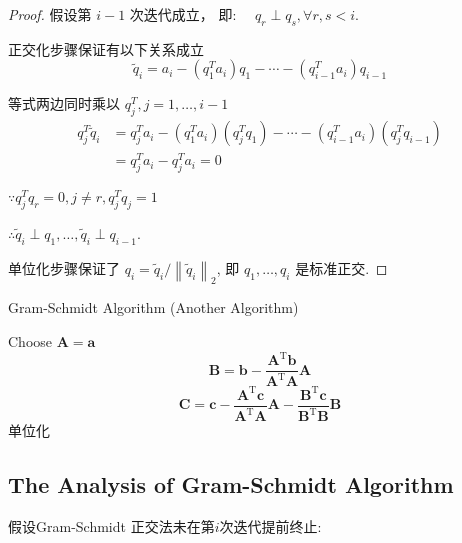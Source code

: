 \begin{proof}
    假设第 $ i-1 $ 次迭代成立， 即: $ \quad q_{r} \perp q_{s}, \forall r, s<i $.

    正交化步骤保证有以下关系成立
    $$ \widetilde{q}_{i}=a_{i}-\left(q_{1}^{T} a_{i}\right) q_{1}-\cdots-\left(q_{i-1}^{T} a_{i}\right) q_{i-1} $$

    等式两边同时乘以 $ q_{j}^{T}, j=1, \ldots, i-1 $
    $$ \begin{aligned} q_{j}^{T} \tilde{q}_{i} &=q_{j}^{T} a_{i}-\left(q_{1}^{T} a_{i}\right)\left(q_{j}^{T} q_{1}\right)-\cdots-\left(q_{i-1}^{T} a_{i}\right)\left(q_{j}^{T} q_{i-1}\right) \\ &=q_{j}^{T} a_{i}-q_{j}^{T} a_{i}=0  \end{aligned} $$

    $ \because q_{j}^{T} q_{r}=0, j \neq r, q_{j}^{T} q_{j}=1 $

     $\therefore \widetilde{q}_{i} \perp q_{1}, \ldots, \widetilde{q}_{i} \perp q_{i-1} $.

    单位化步骤保证了 $ q_{i}=\widetilde{q}_{i} /\left\|\widetilde{q}_{i}\right\|_{2} $, 即 $ q_{1}, \ldots, q_{i} $ 是标准正交. 
\end{proof}

\begin{algorithm}
    \caption{Gram-Schmidt Algorithm (Another Algorithm)}
    Choose $ \boldsymbol{A}=\boldsymbol{a} $\;
    $$ \boldsymbol{B}=\boldsymbol{b}-\frac{\boldsymbol{A}^{\mathrm{T}} \boldsymbol{b}}{\boldsymbol{A}^{\mathrm{T}} \boldsymbol{A}} \boldsymbol{A} $$\;
    $$ \boldsymbol{C}=\boldsymbol{c}-\frac{\boldsymbol{A}^{\mathrm{T}} \boldsymbol{c}}{\boldsymbol{A}^{\mathrm{T}} \boldsymbol{A}} \boldsymbol{A}-\frac{\boldsymbol{B}^{\mathrm{T}} \boldsymbol{c}}{\boldsymbol{B}^{\mathrm{T}} \boldsymbol{B}} \boldsymbol{B}   $$\;
    单位化\;
\end{algorithm}

\subsection{The Analysis of Gram-Schmidt Algorithm}

假设Gram-Schmidt 正交法未在第$i$次迭代提前终止:

